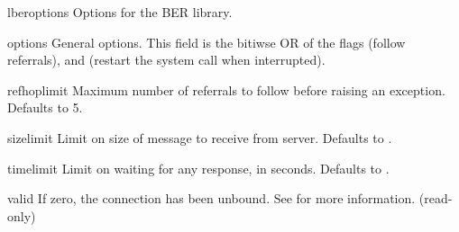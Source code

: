 
\begin{memberdesc}[int]{lberoptions}
    Options for the BER library.
\end{memberdesc}


\begin{memberdesc}[int]{options}
    General options. This field is the bitiwse OR of the flags
	 (follow referrals), and
	   (restart the  system call
			      when interrupted).
\end{memberdesc}


\begin{memberdesc}[int]{refhoplimit}
    Maximum number of referrals to follow before raising an exception.
    Defaults to 5.
\end{memberdesc}


\begin{memberdesc}[int]{sizelimit}
    Limit on size of message to receive from server. 
    Defaults to .
\end{memberdesc}


\begin{memberdesc}[int]{timelimit}
    Limit on waiting for any response, in seconds. 
    Defaults to .
\end{memberdesc}


\begin{memberdesc}[int]{valid}
    If zero, the connection has been unbound. See  for
    more information.
    (read-only)
\end{memberdesc}
